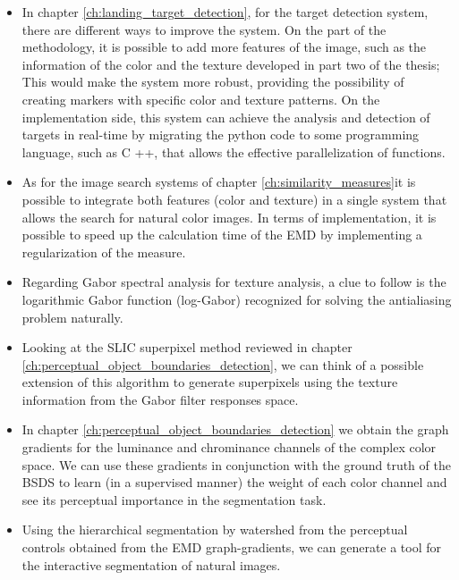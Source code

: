 \begin{itemize}
	\item In chapter \ref{ch:landing_target_detection}, for the target detection system, there are different ways to improve the system. On the part of the methodology, it is possible to add more features of the image, such as the information of the color and the texture developed in part two of the thesis; This would make the system more robust, providing the possibility of creating markers with specific color and texture patterns. On the implementation side, this system can achieve the analysis and detection of targets in real-time by migrating the python code to some programming language, such as C ++, that allows the effective parallelization of functions.
	 \item As for the image search systems of chapter \ref{ch:similarity_measures}it is possible to integrate both features (color and texture) in a single system that allows the search for natural color images. In terms of implementation, it is possible to speed up the calculation time of the EMD by implementing a regularization of the measure.
	 \item Regarding Gabor spectral analysis for texture analysis, a clue to follow is the logarithmic Gabor function (log-Gabor) recognized for solving the antialiasing problem naturally.
	 \item Looking at the SLIC superpixel method reviewed in chapter \ref{ch:perceptual_object_boundaries_detection}, we can think of a possible extension of this algorithm to generate superpixels using the texture information from the Gabor filter responses space.
	 \item In chapter \ref{ch:perceptual_object_boundaries_detection} we obtain the graph gradients for the luminance and chrominance channels of the complex color space. We can use these gradients in conjunction with the ground truth of the BSDS to learn (in a supervised manner) the weight of each color channel and see its perceptual importance in the segmentation task.
	 \item Using the hierarchical segmentation by watershed from the perceptual controls obtained from the EMD graph-gradients, we can generate a tool for the interactive segmentation of natural images.
\end{itemize}

